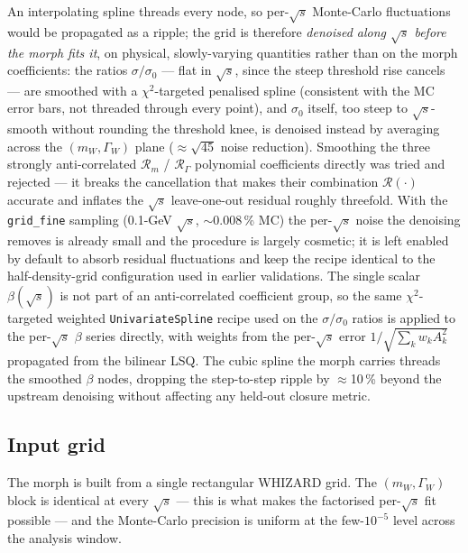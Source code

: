 \documentclass[11pt,a4paper]{article}
\newcommand{\mW}{m_W}
\newcommand{\GammaW}{\Gamma_W}
\newcommand{\sqrts}{\sqrt{s}}
\begin{document}
An interpolating spline threads every node, so per-$\sqrts$
Monte-Carlo fluctuations would be propagated as a ripple; the grid is
therefore \emph{denoised along $\sqrts$ before the morph fits it}, on
physical, slowly-varying quantities rather than on the morph
coefficients: the ratios
$\sigma/\sigma_0$ --- flat in $\sqrts$, since the steep threshold rise
cancels --- are smoothed with a $\chi^2$-targeted penalised spline
(consistent with the MC error bars, not threaded through every point),
and $\sigma_0$ itself, too steep to $\sqrts$-smooth without rounding
the threshold knee, is denoised instead by averaging across the
$(\mW,\GammaW)$ plane ($\approx\!\sqrt{45}$ noise reduction). Smoothing
the three strongly anti-correlated $\mathcal{R}_m$ / $\mathcal{R}_\Gamma$
polynomial coefficients directly was tried and rejected --- it breaks
the cancellation that makes their combination $\mathcal{R}(\cdot)$
accurate and inflates the $\sqrts$ leave-one-out residual roughly
threefold. With the \texttt{grid\_fine} sampling
(0.1-GeV $\sqrts$, $\sim$0.008\,\% MC) the per-$\sqrts$ noise the
denoising removes is already small and the procedure is largely
cosmetic; it is left enabled by default to absorb residual
fluctuations and keep the recipe identical to the half-density-grid
configuration used in earlier validations.
The single scalar $\beta(\sqrts)$ is not
part of an anti-correlated coefficient group, so the same
$\chi^2$-targeted weighted \texttt{UnivariateSpline} recipe used on the
$\sigma/\sigma_0$ ratios is applied to the per-$\sqrts$ $\beta$
series directly, with weights from the per-$\sqrts$ error
$1/\sqrt{\sum_k w_k A_k^2}$ propagated from the bilinear LSQ. The
cubic spline the morph carries threads the smoothed $\beta$
nodes, dropping the step-to-step ripple by $\approx$10\,\% beyond
the upstream denoising without affecting any held-out closure metric.

\subsection{Input grid}\label{sec:morphval-grid}

The morph is built from a single rectangular WHIZARD grid. The $(\mW,\GammaW)$ block is identical at every $\sqrts$ --- this is what makes the factorised per-$\sqrts$ fit possible --- and the Monte-Carlo precision is uniform at the few-$10^{-5}$ level across the analysis window.
\end{document}
